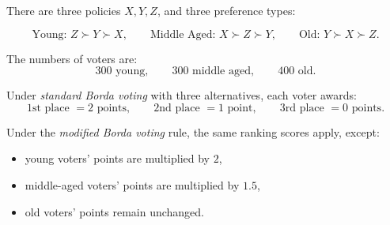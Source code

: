 \documentclass[12pt]{article}
\begin{document}
There are three policies \(X,Y,Z\), and three preference types:

\[
\text{Young: } Z \succ Y \succ X,
\qquad
\text{Middle Aged: } X \succ Z \succ Y,
\qquad
\text{Old: } Y \succ X \succ Z.
\]

The numbers of voters are:
\[
300 \text{ young}, \qquad 300 \text{ middle aged}, \qquad 400 \text{ old}.
\]

Under \emph{standard Borda voting} with three alternatives, each voter awards:
\[
\text{1st place } = 2 \text{ points}, 
\qquad
\text{2nd place } = 1 \text{ point}, 
\qquad
\text{3rd place } = 0 \text{ points}.
\]

Under the \emph{modified Borda voting} rule, the same ranking scores apply, except:
\begin{itemize}
    \item young voters' points are multiplied by \(2\),
    \item middle-aged voters' points are multiplied by \(1.5\),
    \item old voters' points remain unchanged.
\end{itemize}
\end{document}

